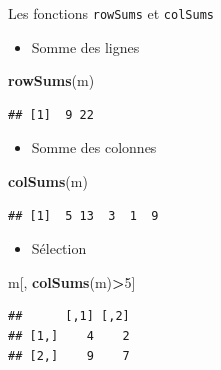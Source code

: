 \documentclass[
  ignorenonframetext,
]{beamer}
\newenvironment{Shaded}{\begin{snugshade}}{\end{snugshade}}
\newcommand{\DecValTok}[1]{\textcolor[rgb]{0.00,0.00,0.81}{#1}}
\newcommand{\FunctionTok}[1]{\textcolor[rgb]{0.13,0.29,0.53}{\textbf{#1}}}
\newcommand{\NormalTok}[1]{#1}
\newcommand{\SpecialCharTok}[1]{\textcolor[rgb]{0.81,0.36,0.00}{\textbf{#1}}}
\providecommand{\tightlist}{%
  \setlength{\itemsep}{0pt}\setlength{\parskip}{0pt}}
\begin{document}
\begin{frame}[fragile]{Les fonctions \texttt{rowSums} et
\texttt{colSums}}
\protect\hypertarget{les-fonctions-rowsums-et-colsums}{}
\begin{itemize}
\tightlist
\item
  Somme des lignes
\end{itemize}

\tiny

\begin{Shaded}
\begin{Highlighting}[]
\FunctionTok{rowSums}\NormalTok{(m)}
\end{Highlighting}
\end{Shaded}

\begin{verbatim}
## [1]  9 22
\end{verbatim}

\normalsize

\begin{itemize}
\tightlist
\item
  Somme des colonnes
\end{itemize}

\tiny

\begin{Shaded}
\begin{Highlighting}[]
\FunctionTok{colSums}\NormalTok{(m)}
\end{Highlighting}
\end{Shaded}

\begin{verbatim}
## [1]  5 13  3  1  9
\end{verbatim}

\normalsize

\begin{itemize}
\tightlist
\item
  Sélection
\end{itemize}

\tiny

\begin{Shaded}
\begin{Highlighting}[]
\NormalTok{m[, }\FunctionTok{colSums}\NormalTok{(m)}\SpecialCharTok{\textgreater{}}\DecValTok{5}\NormalTok{]}
\end{Highlighting}
\end{Shaded}

\begin{verbatim}
##      [,1] [,2]
## [1,]    4    2
## [2,]    9    7
\end{verbatim}

\normalsize
\end{frame}
\end{document}
